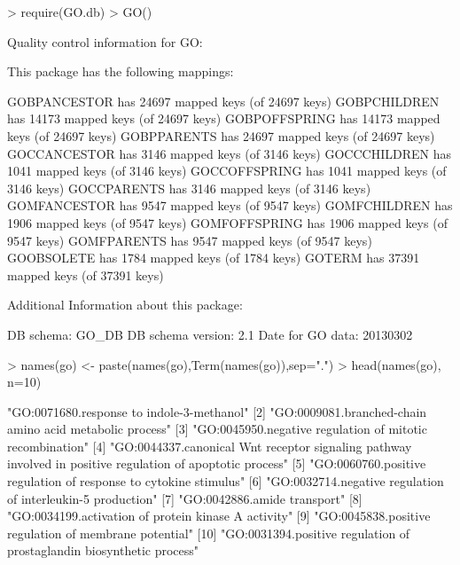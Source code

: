 \documentclass[11pt]{article}
\renewenvironment{Schunk}{\vspace{\topsep}}{\vspace{\topsep}}
\begin{document}
\begin{Schunk}
\begin{Sinput}
> require(GO.db)
> GO()
\end{Sinput}
\begin{Soutput}
Quality control information for GO:


This package has the following mappings:

GOBPANCESTOR has 24697 mapped keys (of 24697 keys)
GOBPCHILDREN has 14173 mapped keys (of 24697 keys)
GOBPOFFSPRING has 14173 mapped keys (of 24697 keys)
GOBPPARENTS has 24697 mapped keys (of 24697 keys)
GOCCANCESTOR has 3146 mapped keys (of 3146 keys)
GOCCCHILDREN has 1041 mapped keys (of 3146 keys)
GOCCOFFSPRING has 1041 mapped keys (of 3146 keys)
GOCCPARENTS has 3146 mapped keys (of 3146 keys)
GOMFANCESTOR has 9547 mapped keys (of 9547 keys)
GOMFCHILDREN has 1906 mapped keys (of 9547 keys)
GOMFOFFSPRING has 1906 mapped keys (of 9547 keys)
GOMFPARENTS has 9547 mapped keys (of 9547 keys)
GOOBSOLETE has 1784 mapped keys (of 1784 keys)
GOTERM has 37391 mapped keys (of 37391 keys)


Additional Information about this package:

DB schema: GO_DB
DB schema version: 2.1
Date for GO data: 20130302
\end{Soutput}
\begin{Sinput}
> names(go) <- paste(names(go),Term(names(go)),sep=".")
> head(names(go), n=10)
\end{Sinput}
\begin{Soutput}
 [1] "GO:0071680.response to indole-3-methanol"                                                                
 [2] "GO:0009081.branched-chain amino acid metabolic process"                                                  
 [3] "GO:0045950.negative regulation of mitotic recombination"                                                 
 [4] "GO:0044337.canonical Wnt receptor signaling pathway involved in positive regulation of apoptotic process"
 [5] "GO:0060760.positive regulation of response to cytokine stimulus"                                         
 [6] "GO:0032714.negative regulation of interleukin-5 production"                                              
 [7] "GO:0042886.amide transport"                                                                              
 [8] "GO:0034199.activation of protein kinase A activity"                                                      
 [9] "GO:0045838.positive regulation of membrane potential"                                                    
[10] "GO:0031394.positive regulation of prostaglandin biosynthetic process"                                    
\end{Soutput}
\end{Schunk}
\end{document}
